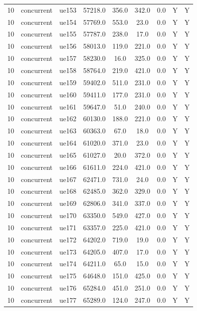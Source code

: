 \begin{table}[ht]
\begin{tabular}{|c|c|c|c|c|c|c|c|c|}
10 & concurrent & ue153 & 57218.0 & 356.0 & 342.0 & 0.0 & Y & Y \\
10 & concurrent & ue154 & 57769.0 & 553.0 & 23.0 & 0.0 & Y & Y \\
10 & concurrent & ue155 & 57787.0 & 238.0 & 17.0 & 0.0 & Y & Y \\
10 & concurrent & ue156 & 58013.0 & 119.0 & 221.0 & 0.0 & Y & Y \\
10 & concurrent & ue157 & 58230.0 & 16.0 & 325.0 & 0.0 & Y & Y \\
10 & concurrent & ue158 & 58764.0 & 219.0 & 421.0 & 0.0 & Y & Y \\
10 & concurrent & ue159 & 59402.0 & 511.0 & 231.0 & 0.0 & Y & Y \\
10 & concurrent & ue160 & 59411.0 & 177.0 & 231.0 & 0.0 & Y & Y \\
10 & concurrent & ue161 & 59647.0 & 51.0 & 240.0 & 0.0 & Y & Y \\
10 & concurrent & ue162 & 60130.0 & 188.0 & 221.0 & 0.0 & Y & Y \\
10 & concurrent & ue163 & 60363.0 & 67.0 & 18.0 & 0.0 & Y & Y \\
10 & concurrent & ue164 & 61020.0 & 371.0 & 23.0 & 0.0 & Y & Y \\
10 & concurrent & ue165 & 61027.0 & 20.0 & 372.0 & 0.0 & Y & Y \\
10 & concurrent & ue166 & 61611.0 & 224.0 & 421.0 & 0.0 & Y & Y \\
10 & concurrent & ue167 & 62471.0 & 731.0 & 24.0 & 0.0 & Y & Y \\
10 & concurrent & ue168 & 62485.0 & 362.0 & 329.0 & 0.0 & Y & Y \\
10 & concurrent & ue169 & 62806.0 & 341.0 & 337.0 & 0.0 & Y & Y \\
10 & concurrent & ue170 & 63350.0 & 549.0 & 427.0 & 0.0 & Y & Y \\
10 & concurrent & ue171 & 63357.0 & 225.0 & 421.0 & 0.0 & Y & Y \\
10 & concurrent & ue172 & 64202.0 & 719.0 & 19.0 & 0.0 & Y & Y \\
10 & concurrent & ue173 & 64205.0 & 407.0 & 17.0 & 0.0 & Y & Y \\
10 & concurrent & ue174 & 64211.0 & 65.0 & 15.0 & 0.0 & Y & Y \\
10 & concurrent & ue175 & 64648.0 & 151.0 & 425.0 & 0.0 & Y & Y \\
10 & concurrent & ue176 & 65284.0 & 451.0 & 251.0 & 0.0 & Y & Y \\
10 & concurrent & ue177 & 65289.0 & 124.0 & 247.0 & 0.0 & Y & Y \\

\end{tabular}
\end{table}
